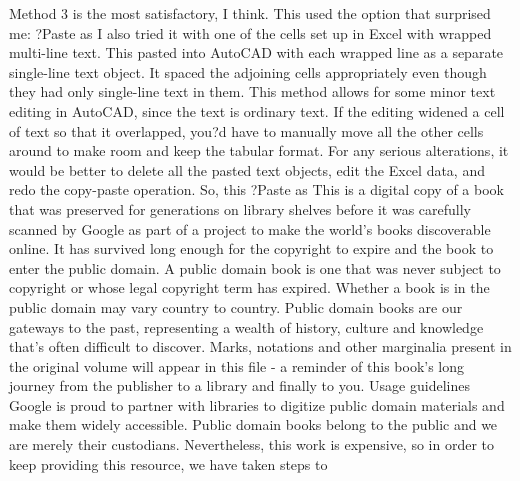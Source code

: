 \documentclass[a4paper]{article}
\begin{document}
Method 3 is the most satisfactory, I think. This used the option that surprised me: ?Paste as %
I also tried it with one of the cells set up in Excel with wrapped multi-line text. This pasted into AutoCAD with each wrapped line as a separate single-line text object. It spaced the adjoining cells appropriately even though they had only single-line text in them.
This method allows for some minor text editing in AutoCAD, since the text is ordinary text. If the editing widened a cell of text so that it overlapped, you?d have to manually move all the other cells around to make room and keep the tabular format. For any serious alterations, it would be better to delete all the pasted text objects, edit the Excel data, and redo the copy-paste operation.
So, this ?Paste as %
This is a digital copy of a book that was preserved for generations on library shelves before it was carefully scanned by Google as part of a project 
to make the world's books discoverable online. 
It has survived long enough for the copyright to expire and the book to enter the public domain. A public domain book is one that was never subject 
to copyright or whose legal copyright term has expired. Whether a book is in the public domain may vary country to country. Public domain books 
are our gateways to the past, representing a wealth of history, culture and knowledge that's often difficult to discover. 
Marks, notations and other marginalia present in the original volume will appear in this file - a reminder of this book's long journey from the 
publisher to a library and finally to you. 
Usage guidelines 
Google is proud to partner with libraries to digitize public domain materials and make them widely accessible. Public domain books belong to the 
public and we are merely their custodians. Nevertheless, this work is expensive, so in order to keep providing this resource, we have taken steps to 
\end{document}
